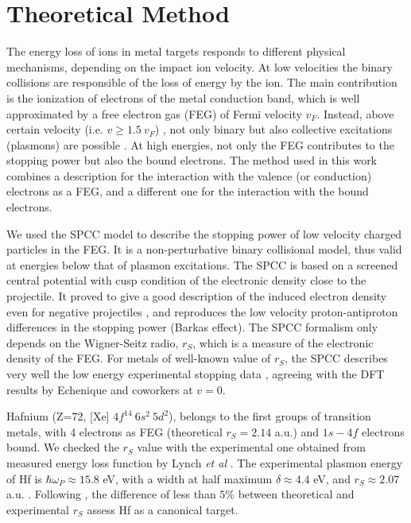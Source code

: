 \documentclass[aps,prb,reprint,groupedaddress]{revtex4-1}
\begin{document}
\section{Theoretical Method} \label{theory}
The energy loss of ions in metal targets responds to different physical mechanisms, depending on the impact ion velocity. At low velocities the binary collisions are responsible of the loss of energy by the ion. The main contribution is the ionization of electrons of the metal conduction band, which is well approximated by a free electron gas (FEG) of Fermi velocity $v_F$. Instead, above certain velocity (i.e. $v\geq 1.5 \ v_F$) , not only binary but also collective excitations (plasmons) are possible \cite{mon17}. At high energies, not only the FEG contributes to the stopping power but also the bound electrons. The method used in this work combines a description for the interaction with the valence (or conduction) electrons as a FEG, and a different one for the interaction with the bound electrons.

We used the SPCC model \cite{mon17} to describe the stopping power of low velocity charged particles in the FEG. It is a non-perturbative binary collisional model, thus valid at energies below that of plasmon excitations.  The SPCC \cite{mon17} is based on a screened central potential with cusp condition of the electronic density close to the projectile. It proved to give a good description of the induced electron density even for negative projectiles \cite{mon17}, and reproduces the low velocity proton-antiproton differences in the stopping power (Barkas effect). The SPCC formalism only depends on the Wigner-Seitz radio, $r_S$, which is a measure of the electronic density of the FEG. For metals of well-known value of $r_S$, the SPCC describes very well the low energy experimental stopping data \cite{mon17}, agreeing with the DFT results by Echenique and coworkers \cite{eche81,nagy89} at $v=0$. 

Hafnium (Z=72, [Xe] $4f^{14} \ 6s^2 \ 5d^2$), belongs to the first groups of transition metals, with  4 electrons as FEG (theoretical $r_S=2.14$ a.u.) and $1s-4f$ electrons bound. We checked the $r_S$ value with the experimental one obtained from measured energy loss function by Lynch \textit{et al} \cite{lynch75}. The experimental plasmon energy of Hf is $\hbar\omega_P \approx 15.8$ eV, with a width at half maximum $\delta \approx 4.4$ eV, and $r_S \approx 2.07$ a.u. \cite{lynch75}. Following \cite{mon17}, the difference of less than $5\%$ between theoretical and experimental $r_S$ assess Hf as a canonical target.
\end{document}

